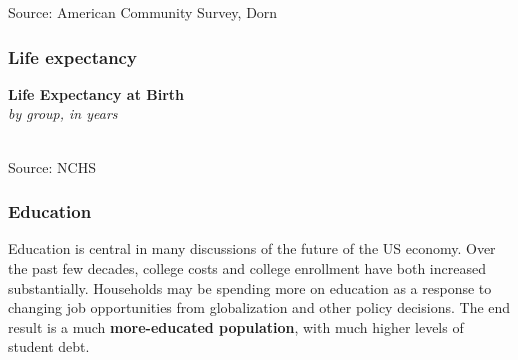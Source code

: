 \documentclass{report}
\makeatletter
\newcommand{\tbllink}[1]{\href{https://raw.githubusercontent.com/bdecon/US-chartbook/master/chartbook/data/#1}{\faTable}}
\newcommand*\short[1]{\expandafter\@gobbletwo\number\numexpr#1\relax}
\newcommand{\absnode}[3]{\node[below right, align=left] at (axis cs: #1,#2) {#3};}
\newcommand{\shdateaxisticks}{
		date coordinates in=x, axis line style={draw=none},
		xmax={2023-02-15},
		max space between ticks=40,	    
		xtick={{1990-01-01}, {1995-01-01}, {2000-01-01}, 
			{2005-01-01}, {2010-01-01}, {2015-01-01}, {2020-01-01}},
		minor xtick={},
		enlarge y limits={0.06}, enlarge x limits={0.01},
		}
\newcommand{\bbar}[2]{extra #1 ticks = {{#2}}, extra #1 tick labels = ,
		extra #1 tick style = {grid=major, grid style={thick, black!25}},}
\newcommand{\thickline}[4]{\addplot[ultra thick, no markers, color=#1] 
		table [x=#2, y=#3, col sep=comma] {#4};	}
\newcommand{\rbars}{
		\fill[color=black!10] (axis cs:{1990-07-01},\pgfkeysvalueof{/pgfplots/ymin}) rectangle 
			(axis cs:{1991-03-01}, \pgfkeysvalueof{/pgfplots/ymax});
		\fill[color=black!10] (axis cs:{2007-12-01},\pgfkeysvalueof{/pgfplots/ymin}) rectangle 
			(axis cs:{2009-07-01}, \pgfkeysvalueof{/pgfplots/ymax});
		\fill[color=black!10] (axis cs:{2001-03-01},\pgfkeysvalueof{/pgfplots/ymin}) rectangle 
			(axis cs:{2001-11-01}, \pgfkeysvalueof{/pgfplots/ymax});
		\fill[color=black!10] (axis cs:{2020-02-01},\pgfkeysvalueof{/pgfplots/ymin}) rectangle 
			(axis cs:{2020-05-01}, \pgfkeysvalueof{/pgfplots/ymax});}
\makeatother
\begin{document}
{\vspace{-3mm}
\hspace{-9mm}  \hspace{-3mm} 

\vspace{-4mm}
\footnotesize{Source: American Community Survey, Dorn} \hspace{61mm} \tbllink{acs_cz_age.csv}
\vspace{3.5mm}

\begin{minipage}{0.76\textwidth}
\subsubsection*{Life expectancy}
\vspace{-0.5mm}

\small 

\begin{minipage}{0.435\textwidth} 
\normalsize \textbf{Life Expectancy at Birth}\\
\footnotesize{\textit{by group, in years}}\\
\noindent \hspace*{-2mm} \\
\footnotesize{Source: NCHS} \hfill \tbllink{life_exp.csv}\end{minipage}\hfill
\begin{minipage}{0.5\textwidth}
\small 
\end{minipage}
\end{minipage}
\newpage
\begin{minipage}{0.76\textwidth}
\subsubsection*{Education}
\small Education is central in many discussions of the future of the US economy. Over the past few decades, college costs and college enrollment have both increased substantially. Households may be spending more on education as a response to changing job opportunities from globalization and other policy decisions. The end result is a much \textbf{more-educated population}, with much higher levels of student debt.
\end{minipage}
\vspace{1mm}

}
\end{document}
